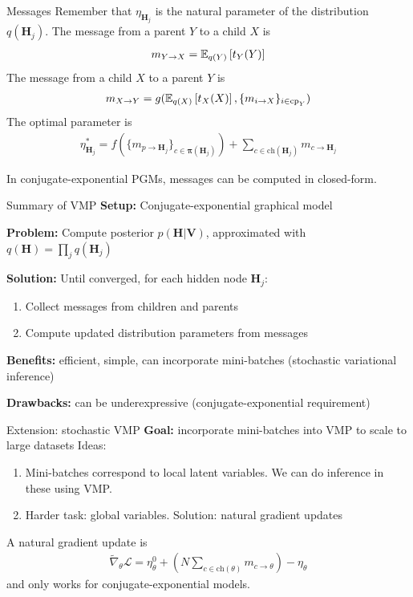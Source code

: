 \documentclass[10pt, compress]{beamer}
\begin{document}
\begin{frame}{Messages}
  Remember that $\eta_{\mathbf{H}_j}$ is the natural parameter of the distribution $q(\mathbf{H}_j)$.
	\pause
	The message from a parent $Y$ to a child $X$ is
	\begin{align*}
    m_{Y \rightarrow X} = \mathbb{E}_{q(Y)}\left[t_Y(Y)\right]
	\end{align*}
		\pause
	The message from a child $X$ to a parent $Y$ is
	\begin{align*}
    m_{X \rightarrow Y} = g(\mathbb{E}_{q(X)}\left[t_X(X)\right], \{m_{i \rightarrow X}\}_{i \in \textrm{cp}_Y})
	\end{align*}
  \pause
  The optimal parameter is
	\begin{align*}
    \eta_{\mathbf{H}_j}^* = f(\{m_{p \rightarrow \mathbf{H}_j}\}_{c \in \bm{\pi}(\mathbf{H}_j)}) + \sum_{c \in \textrm{ch}(\mathbf{H}_j)} m_{c \rightarrow \mathbf{H}_j}
	\end{align*}

	\pause
	In conjugate-exponential PGMs, messages can be computed in closed-form.
\end{frame}

\begin{frame}{Summary of VMP}
	\textbf{Setup:} Conjugate-exponential graphical model

	\pause
	\textbf{Problem:} Compute posterior $p(\mathbf{H} | \mathbf{V})$, approximated with $q(\mathbf{H}) = \prod_j q(\mathbf{H}_j)$

	\pause
	\textbf{Solution:} Until converged, for each hidden node $\mathbf{H}_j$:
	\begin{enumerate}
			\pause
		\item Collect messages from children and parents
			\pause
		\item Compute updated distribution parameters from messages
	\end{enumerate}

	\pause
	\textbf{Benefits:} efficient, simple, can incorporate mini-batches (stochastic variational inference)

	\pause
	\textbf{Drawbacks:} can be underexpressive (conjugate-exponential requirement)
\end{frame}

\begin{frame}{Extension: stochastic VMP}
  \textbf{Goal:} incorporate mini-batches into VMP to scale to large datasets
  \pause
  Ideas:
  \begin{enumerate}
      \pause
    \item Mini-batches correspond to local latent variables. We can 
      do inference in these using VMP.
      \pause
    \item Harder task: global variables. Solution: natural gradient updates
  \end{enumerate}
  \pause
  A natural gradient update is
  \begin{align*}
    \tilde{\nabla}_\theta \mathcal{L} = \eta^0_{\theta} + \left(N\sum_{c \in \textrm{ch}(\theta)} m_{c \rightarrow \theta}\right) - \eta_\theta
  \end{align*}
  and only works for conjugate-exponential models.
\end{frame}
\end{document}
